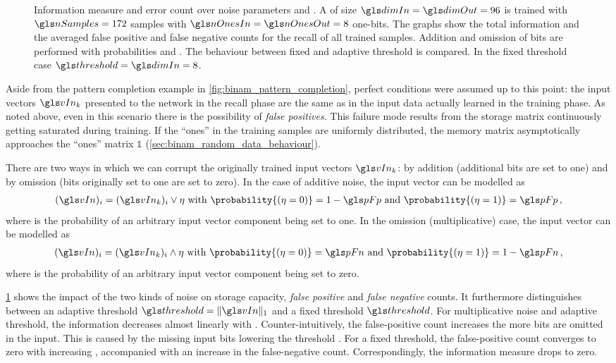 \begin{figure}[t]
	\caption[Information measure and error count over noise]{Information measure and error count over noise parameters \pFn and \pFp. A \BiNAM of size $\dimIn = \dimOut = 96$ is trained with  $\nSamples = 172$ samples with $\nOnesIn = \nOnesOut = 8$ one-bits. The graphs show the total information and the averaged false positive and false negative counts for the recall of all trained samples. Addition and omission of bits are performed with probabilities \pFn and \pFp. The behaviour between fixed and adaptive threshold \threshold is compared. In the fixed threshold case $\threshold = \dimIn = 8$.}
	\label{fig:sketch_info_over_noise}
\end{figure}

Aside from the pattern completion example in \cref{fig:binam_pattern_completion}, perfect conditions were assumed up to this point: the input vectors $\vIn_k$ presented to the network in the recall phase are the same as in the input data \data actually learned in the training phase. As noted above, even in this scenario there is the possibility of \emph{false positives}. This failure mode results from the storage matrix continuously getting saturated during training. If the \enquote{ones} in the training samples are uniformly distributed, the memory matrix \memMat asymptotically approaches the \enquote{ones} matrix $\mathbb{1}$ (\cref{sec:binam_random_data_behaviour}).

There are two ways in which we can corrupt the originally trained input vectors $\vIn_k$: by addition (additional bits are set to one) and by omission (bits originally set to one are set to zero). In the case of additive noise, the input vector \vIn can be modelled as
\begin{align}
	(\vIn)_i = (\vIn_k)_i \vee \eta \text{ with } \probability{(\eta = 0)} = 1 - \pFp \text{ and } \probability{(\eta = 1)} = \pFp \,,
\end{align}
where \pFp is the probability of an arbitrary input vector component being set to one. In the omission (multiplicative) case, the input vector \vIn can be modelled as
\begin{align}
	(\vIn)_i = (\vIn_k)_i \wedge \eta \text{ with } \probability{(\eta = 0)} = \pFn \text{ and } \probability{(\eta = 1)} = 1 - \pFn \,,
\end{align}
where \pFn is the probability of an arbitrary input vector component being set to zero. 

\cref{fig:sketch_info_over_noise} shows the impact of the two kinds of noise on storage capacity, \emph{false positive} and \emph{false negative} counts. It furthermore distinguishes between an adaptive threshold $\threshold = \|\vIn\|_1$ and a fixed threshold $\threshold$. For multiplicative noise and adaptive threshold, the information \info decreases almost linearly with \pFn. Counter-intuitively, the false-positive count increases the more bits are omitted in the input. This is caused by the missing input bits lowering the threshold \threshold. For a fixed threshold, the false-positive count converges to zero with increasing \pFn, accompanied with an increase in the false-negative count. Correspondingly, the information measure drops to zero.

